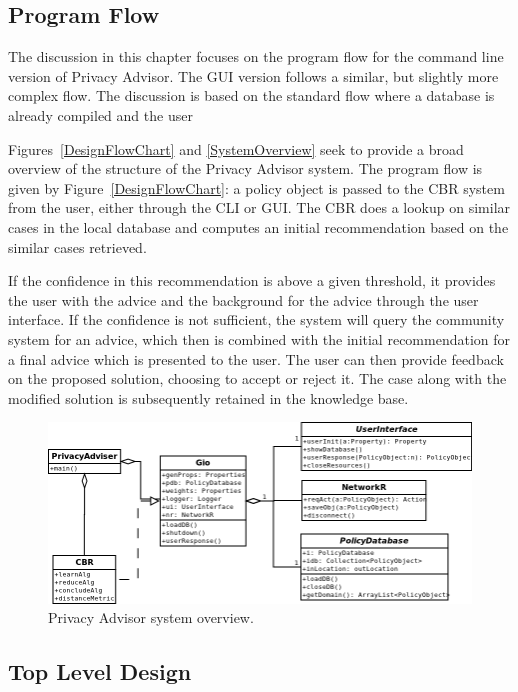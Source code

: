 \subsection{Program Flow}
The discussion in this chapter focuses on the program flow for the command line version of Privacy Advisor. The GUI version follows a similar, but slightly more complex flow. The discussion is based on the standard flow where a database is already compiled and the user 

Figures~\ref{DesignFlowChart} and \ref{SystemOverview} seek to provide a broad overview of the structure of the Privacy Advisor system. The program flow is given by Figure~\ref{DesignFlowChart}: a policy object is passed to the CBR system from the user, either through the CLI or GUI. The CBR does a lookup on similar cases in the local database and computes an initial recommendation based on the similar cases retrieved. 

If the confidence in this recommendation is above a given threshold, it provides the user with the advice and the background for the advice through the user interface. If the confidence is not sufficient, the system will query the community system for an advice, which then is combined with the initial recommendation for a final advice which is presented to the user. The user can then provide feedback on the proposed solution, choosing to accept or reject it. The case along with the modified solution is subsequently retained in the knowledge base.



\begin{figure}[htbp]
\begin{center}
\includegraphics[width = \textwidth]{DesignReport/uml/main_2.png}
\caption{Privacy Advisor system overview.}
\label{overviewFig}
\end{center}
\end{figure}


\subsection{Top Level Design}


